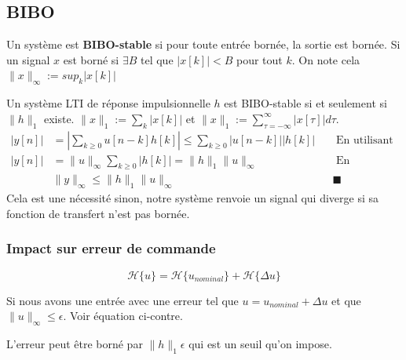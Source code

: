 \documentclass{report}
\begin{document}
\subsection{BIBO}
Un système est \textbf{BIBO-stable} si pour toute entrée bornée, la sortie est bornée. Si un signal $x$ est borné  si $\exists B$ tel que $|x[k]| < B$ pour tout $k$. On note cela $\parallel x \parallel_{\infty} := sup_k |x[k]|$ \par 
Un système LTI de réponse impulsionnelle $h$ est BIBO-stable si et seulement si $\parallel h \parallel_1$ existe. $\parallel x \parallel_1 := \sum_k |x[k]|$ et $\parallel x \parallel_1 := \sum_{\tau = -\infty}^{\infty} |x[\tau]| d \tau$.
\begin{align*}
|y[n]| &= \left| \sum_{k \geqslant 0} u[n-k]h[k] \right| \leqslant \sum_{k \geqslant 0} |u[n-k]||h[k]| & & \text{ En utilisant l'inégalité triangulaire}\\
|y[n]| &= \parallel u \parallel_{\infty}  \sum_{k \geqslant 0} |h[k]| = \parallel h \parallel_1 \parallel u \parallel_{\infty} & & \text{ En supposant que notre signal d'entrée u est borné}\\
&\parallel y \parallel_{\infty} \leqslant \parallel h \parallel_1 \parallel u \parallel_{\infty} & & \blacksquare
\end{align*}
Cela est une nécessité sinon, notre système renvoie un signal qui diverge si sa fonction de transfert n'est pas bornée.

\subsubsection{Impact sur erreur de commande}
\begin{figure}
\centering
\begin{equation}
\mathcal{H}\{u\} = \mathcal{H} \{u_{nominal}\} + \mathcal{H}\{\Delta u\}
\end{equation}
\end{figure}
Si nous avons une entrée avec une erreur tel que $u = u_{nominal} + \Delta u$ et que $\parallel u \parallel_{\infty} \leqslant \epsilon$. Voir équation ci-contre.\par
L'erreur peut être borné par $\parallel h \parallel_1 \epsilon$ qui est un seuil qu'on impose.
\end{document}
